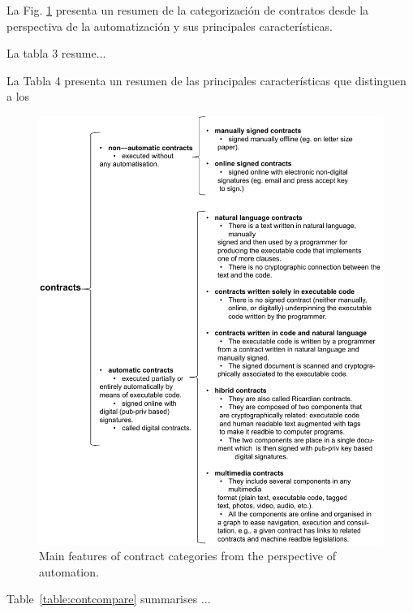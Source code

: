 \documentclass[12pt]{report} %
\begin{document}
La Fig. \ref{fig:contcateautofeatures}  presenta un resumen de la categorización de contratos desde la perspectiva de la automatización y sus principales características.

	La tabla 3 resume...
 
	La Tabla 4 presenta un resumen de las principales características que distinguen a los
	
	
	
	
	
	\begin{figure}
\centering
\includegraphics[width=0.98\columnwidth]{figures/contcateautofeatures.pdf}
\caption{Main features of contract categories from the perspective of automation.}
\label{fig:contcateautofeatures}
\end{figure}







Table~\ref{table:contcompare} summarises ...
\end{document}

